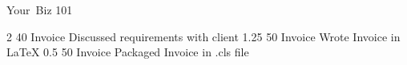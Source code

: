 \documentclass[
    letterpaper %
    ,
currency={euro} %
]{dapper-invoice}
\newcommand{\invoiceNo}
{101} %
\begin{document}
\newfontface{}
\makeheader
{Your\ \mainLightItalic Biz}%
{\invoiceNo}




        {2}%
        {40}%
        {Invoice}%
        {Discussed requirements with client}%
        {1.25}%
        {50}%
        {Invoice}%
        {Wrote Invoice in LaTeX}%
        {0.5}%
        {50}%
        {Invoice}%
        {Packaged Invoice in .cls file}%
\end{document}
